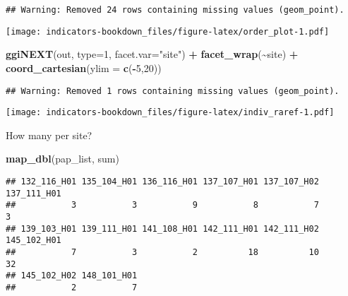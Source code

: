 \documentclass[
]{book}
\newenvironment{Shaded}{\begin{snugshade}}{\end{snugshade}}
\newcommand{\DataTypeTok}[1]{\textcolor[rgb]{0.13,0.29,0.53}{#1}}
\newcommand{\DecValTok}[1]{\textcolor[rgb]{0.00,0.00,0.81}{#1}}
\newcommand{\KeywordTok}[1]{\textcolor[rgb]{0.13,0.29,0.53}{\textbf{#1}}}
\newcommand{\NormalTok}[1]{#1}
\newcommand{\OperatorTok}[1]{\textcolor[rgb]{0.81,0.36,0.00}{\textbf{#1}}}
\newcommand{\StringTok}[1]{\textcolor[rgb]{0.31,0.60,0.02}{#1}}
\begin{document}
\begin{verbatim}
## Warning: Removed 24 rows containing missing values (geom_point).
\end{verbatim}

\texttt{[image: indicators-bookdown\_files/figure-latex/order\_plot-1.pdf]}

\begin{Shaded}
\begin{Highlighting}[]
\KeywordTok{ggiNEXT}\NormalTok{(out, }\DataTypeTok{type=}\DecValTok{1}\NormalTok{, }\DataTypeTok{facet.var=}\StringTok{"site"}\NormalTok{) }\OperatorTok{+}\StringTok{ }
\StringTok{  }\KeywordTok{facet\_wrap}\NormalTok{(}\OperatorTok{\textasciitilde{}}\NormalTok{site) }\OperatorTok{+}\StringTok{ }\KeywordTok{coord\_cartesian}\NormalTok{(}\DataTypeTok{ylim =} \KeywordTok{c}\NormalTok{(}\OperatorTok{{-}}\DecValTok{5}\NormalTok{,}\DecValTok{20}\NormalTok{))}
\end{Highlighting}
\end{Shaded}

\begin{verbatim}
## Warning: Removed 1 rows containing missing values (geom_point).
\end{verbatim}

\texttt{[image: indicators-bookdown\_files/figure-latex/indiv\_raref-1.pdf]}

How many per site?

\begin{Shaded}
\begin{Highlighting}[]
\KeywordTok{map\_dbl}\NormalTok{(pap\_list, sum)}
\end{Highlighting}
\end{Shaded}

\begin{verbatim}
## 132_116_H01 135_104_H01 136_116_H01 137_107_H01 137_107_H02 137_111_H01 
##           3           3           9           8           7           3 
## 139_103_H01 139_111_H01 141_108_H01 142_111_H01 142_111_H02 145_102_H01 
##           7           3           2          18          10          32 
## 145_102_H02 148_101_H01 
##           2           7
\end{verbatim}

  
\end{document}

